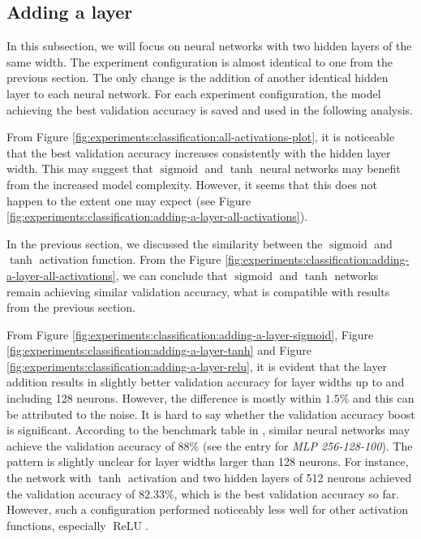 \subsection{Adding a layer}
\label{subsection:experiments:classification:adding-a-layer}
In this subsection, we will focus on neural networks with two hidden layers of the same width. The experiment configuration is almost identical to one from the previous section. The only change is the addition of another identical hidden layer to each neural network.
For each experiment configuration, the model achieving the best validation accuracy is saved and used in the following analysis.

From Figure \ref{fig:experiments:classification:all-activations-plot}, it is noticeable that the best validation accuracy increases consistently with the hidden layer width. This may suggest that $\operatorname{sigmoid}$ and $\operatorname{tanh}$ neural networks may benefit from the increased model complexity. However, it seems that this does not happen to the extent one may expect (see Figure \ref{fig:experiments:classification:adding-a-layer-all-activations}).

In the previous section, we discussed the similarity between the $\operatorname{sigmoid}$ and $\operatorname{tanh}$ activation function. From the Figure \ref{fig:experiments:classification:adding-a-layer-all-activations}, we can conclude that $\operatorname{sigmoid}$ and $\operatorname{tanh}$ networks remain achieving similar validation accuracy, what is compatible with results from the previous section.

From Figure \ref{fig:experiments:classification:adding-a-layer-sigmoid}, Figure \ref{fig:experiments:classification:adding-a-layer-tanh} and Figure \ref{fig:experiments:classification:adding-a-layer-relu}, it is evident that the layer addition results in slightly better validation accuracy for layer widths up to and including 128 neurons. However, the difference is mostly within $1.5\%$ and this can be attributed to the noise. It is hard to say whether the validation accuracy boost is significant. According to the benchmark table in \cite{fashionmnistgithub}, similar neural networks may achieve the validation accuracy of $88\%$ (see the entry for \textit{MLP 256-128-100}). The pattern is slightly unclear for layer widths larger than 128 neurons. For instance, the network with $\operatorname{tanh}$ activation and two hidden layers of 512 neurons achieved the validation accuracy of $82.33\%$, which is the best validation accuracy so far. However, such a configuration performed noticeably less well for other activation functions, especially $\operatorname{ReLU}$.

